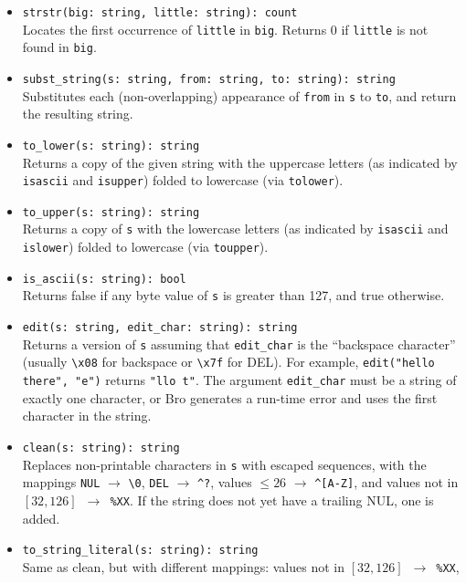 \documentclass[10pt,landscape]{article}
\begin{document}
\begin{multicols*}{2}
\begin{itemize}
  \item \verb|strstr(big: string, little: string): count|\\
    Locates the first occurrence of \texttt{little} in \texttt{big}.
    Returns 0 if \texttt{little} is not found in \texttt{big}.
  \item \verb|subst_string(s: string, from: string, to: string): string|\\
    Substitutes each (non-overlapping) appearance of \texttt{from} in
    \texttt{s} to \texttt{to}, and return the resulting string.
  \item \verb|to_lower(s: string): string|\\
    Returns a copy of the given string with the uppercase letters (as indicated
    by \verb|isascii| and \verb|isupper|) folded to lowercase (via
    \verb|tolower|).
  \item \verb|to_upper(s: string): string|\\
    Returns a copy of \verb|s| with the lowercase letters (as indicated by
    \verb|isascii| and \verb|islower|) folded to lowercase (via
    \verb|toupper|).
  \item \verb|is_ascii(s: string): bool|\\
    Returns false if any byte value of \texttt{s} is greater than 127, and true
    otherwise.
  \item \verb|edit(s: string, edit_char: string): string|\\
    Returns a version of \verb|s| assuming that \verb|edit_char| is the
    ``backspace character'' (usually \verb|\x08| for backspace or \verb|\x7f|
    for DEL). For example, \verb|edit("hello there", "e")| returns
    \verb|"llo t"|. The argument \verb|edit_char| must be a string of exactly
    one character, or Bro generates a run-time error and uses the first
    character in the string.
  \item \verb|clean(s: string): string|\\
    Replaces non-printable characters in \texttt{s} with escaped sequences,
    with the mappings
    \verb|NUL| $\rightarrow$ \verb|\0|,
    \verb|DEL| $\rightarrow$ \verb|^?|,
    values $\le 26$ $\rightarrow$ \verb|^[A-Z]|,
    and values not in $[32, 126]$~$\rightarrow$~\verb|%XX|. If the string does
    not yet have a trailing NUL, one is added.
  \item \verb|to_string_literal(s: string): string|\\
    Same as clean, but with different mappings:
    values not in $[32, 126]$~$\rightarrow$~\verb|%XX|,

\end{itemize}
\end{multicols*}
\end{document}

